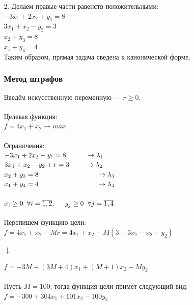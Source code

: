 \documentclass[14pt,a4paper,fleqn]{extarticle}
\begin{document}
2. Делаем правые части равенств положительными:\\
$-3x_1 + 2x_2 + y_1 = 8$\\
$3x_1 + x_2 - y_2 = 3$\\
$x_2 + y_3 = 8$\\
$x_1 + y_4 = 4$\\

Таким образом, прямая задача сведена к канонической форме.
\newpage
\subsubsection*{Метод штрафов}
Введём искусственную переменную --- $r \geq 0$.\\\\
Целевая функция:\\
$f = 4x_1+x_2 \longrightarrow max$\\\\
Ограничения:\\
$-3x_1 + 2x_2 + y_1 = 8 \hspace*{1cm} \rightarrow \lambda_1$\\
$3x_1 + x_2 - y_2 + r = 3 \hspace*{0.8cm} \rightarrow \lambda_2$\\
$x_2 + y_3 = 8 \hspace*{3cm} \rightarrow \lambda_3$\\
$x_1 + y_4 = 4 \hspace*{3cm} \rightarrow \lambda_4$\\\\
$x_i \geq 0 \hspace{0.2cm} \forall i = \overline{1,2}; \hspace{0.5cm} y_j \geq 0 \hspace{0.2cm} \forall j =  \overline{1,4}$\\\\
Перепишем функцию цели:\\
$f = 4x_1 + x_2 - Mr = 4x_1 + x_2 - M(3 - 3x_1 - x_2 + y_2)$
\begin{center}$\downarrow$\end{center}
$f = -3M + (3M + 4)x_1 + (M + 1)x_2 - My_2$\\\\
Пусть $M = 100$, тогда функция цели примет следующий вид:\\
$f = -300 + 304x_1 + 101x_2 - 100y_2$
\end{document}
